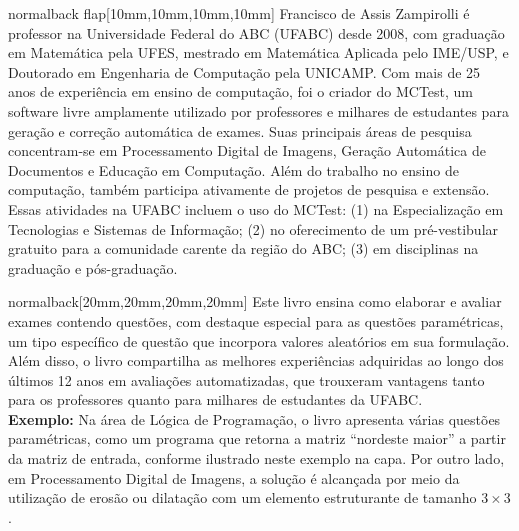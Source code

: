 \documentclass[
    coverwidth=21cm,  %
    coverheight=29.7cm, %
    spinewidth=12mm,  %
    flapwidth=8cm,    %
    wrapwidth=0mm,    %
    ]{bookcover}
\begin{document}
\begin{bookcover}
\begin{bookcoverelement}{normal}{back flap}[10mm,10mm,10mm,10mm]
    \color{black}\large
    Francisco de Assis Zampirolli é professor na Universidade Federal do ABC (UFABC) desde 2008, com graduação em Matemática pela UFES, mestrado em Matemática Aplicada pelo IME/USP, e Doutorado em Engenharia de Computação pela UNICAMP. Com mais de 25 anos de experiência em ensino de computação, foi o criador do MCTest, um software livre amplamente utilizado por professores e mi\-lhares de estudantes para geração e correção automática de exames. Suas principais áreas de pesquisa concentram-se em Processamento Digital de Imagens, Geração Automática de Documentos e Edu\-cação em Computação.
Além do trabalho no ensino de computação, também participa ativamente de projetos de pesquisa e extensão. Essas atividades na UFABC incluem o uso do MCTest:
(1) na Especialização em Tecnologias e Sistemas de Informação;
(2) no oferecimento de um pré-vestibular gratuito para a comunidade carente da região do ABC;
(3) em disciplinas na graduação e pós-graduação.
     \vfill
\end{bookcoverelement}


\begin{bookcoverelement}{normal}{back}[20mm,20mm,20mm,20mm]
\color{black}\Large
Este livro ensina como elaborar e avaliar exames contendo questões, com destaque especial para as questões paramétricas, um tipo específico de questão que incorpora valores aleatórios em sua formulação. Além disso, o livro compartilha as melhores experiências adquiridas ao longo dos últimos 12 anos em avaliações automatizadas, que trouxeram vantagens tanto para os professores quanto para milhares de estudantes da UFABC. \\[3mm]

\textbf{Exemplo:} Na área de Lógica de Programação, o livro apresenta várias questões paramétricas, como um programa que retorna a matriz ``nordeste maior'' a partir da matriz de entrada, conforme ilustrado neste exemplo na capa. Por outro lado, em Processamento Digital de Imagens, a solução é alcançada por meio da utilização de erosão ou dilatação com um elemento estruturante de tamanho $3\times 3$. \\[95mm]


\end{bookcoverelement}
\end{bookcover}
\end{document}
